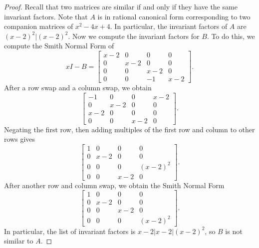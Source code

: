 \documentclass[11pt]{article}
\theoremstyle{definition}
\begin{document}
\begin{proof}
Recall that two matrices are similar if and only if they have the same invariant factors. Note that $A$ is in rational canonical form corresponding to two companion matrices of $x^2-4x+4$. In particular, the invariant factors of $A$ are  $(x-2)^2 | (x-2)^2$. Now we compute the invariant factors for $B$. To do this, we compute the Smith Normal Form of \[ xI-B = \begin{bmatrix} 		x-2 & 0 & 0 & 0 \\ 0 & x-2 & 0 & 0 \\ 0 & 0 & x-2 & 0 \\ 0 & 0 & -1 & x-2\end{bmatrix}.\]
After a row swap and a column swap, we obtain
 \[\begin{bmatrix} 		-1 & 0 & 0 & x-2 \\ 0 & x-2 & 0 & 0 \\ x-2 & 0 & 0 & 0 \\ 0 & 0 & x-2 & 0 \end{bmatrix}.\]
Negating the first row, then adding multiples of the first row and column to other rows gives
 \[\begin{bmatrix} 		1 & 0 & 0 & 0 \\ 0 & x-2 & 0 & 0 \\ 0 & 0 & 0 & (x-2)^2 \\ 0 & 0 & x-2 & 0 \end{bmatrix}.\]
 After another row and column swap, we obtain the Smith Normal Form
 \[\begin{bmatrix} 		1 & 0 & 0 & 0 \\ 0 & x-2 & 0 & 0 \\ 0 & 0 & x-2 & 0 \\ 0 & 0 & 0 & (x-2)^2 \end{bmatrix}.\]
 In particular, the list of invariant factors is $x-2 | x-2 | (x-2)^2$, so $B$ is not similar to $A$.
\end{proof}
\end{document}
